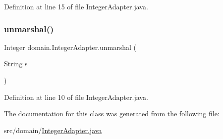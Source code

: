 Definition at line 15 of file Integer\+Adapter.\+java.


\begin{DoxyCode}{0}

\end{DoxyCode}
\mbox{\label{classdomain_1_1IntegerAdapter_ad2bfc5af140573682dd03906b9264b51}} 
\subsubsection{\texorpdfstring{unmarshal()}{unmarshal()}}
{\footnotesize\ttfamily Integer domain.\+Integer\+Adapter.\+unmarshal (\begin{DoxyParamCaption}\item[{String}]{s }\end{DoxyParamCaption})}



Definition at line 10 of file Integer\+Adapter.\+java.


\begin{DoxyCode}{0}

\end{DoxyCode}


The documentation for this class was generated from the following file\+:\begin{DoxyCompactItemize}
\item 
src/domain/\mbox{\hyperlink{IntegerAdapter_8java}{Integer\+Adapter.\+java}}\end{DoxyCompactItemize}
